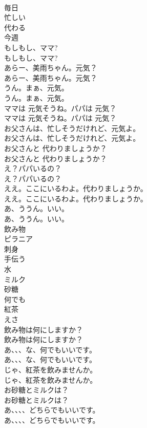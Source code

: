 \documentclass[8pt]{extreport}
\begin{document}
\begin{CJK}{UTF8}{min}
\\	毎日
\\	忙しい
\\	代わる
\\	今週
\\	もしもし、ママ?	
\\	もしもし、ママ? 
\\	あらー、美雨ちゃん。元気？	
\\	あらー、美雨ちゃん。元気？ 
\\	うん。まぁ、元気。	
\\	うん。まぁ、元気。 
\\	ママは 元気そうね。パパは 元気？	
\\	ママは 元気そうね。パパは 元気？ 
\\	お父さんは、忙しそうだけれど、元気よ。	
\\	お父さんは、忙しそうだけれど、元気よ。 
\\	お父さんと 代わりましょうか？	
\\	お父さんと 代わりましょうか？ 
\\	え？パパいるの？	
\\	え？パパいるの？ 
\\	ええ。ここにいるわよ。代わりましょうか。	
\\	ええ。ここにいるわよ。代わりましょうか。 
\\	あ、ううん。いい。	
\\	あ、ううん。いい。 
\\	飲み物
\\	ピラニア
\\	刺身
\\	手伝う
\\	水
\\	ミルク
\\	砂糖
\\	何でも
\\	紅茶
\\	えさ
\\	飲み物は何にしますか？	
\\	飲み物は何にしますか？ 
\\	あ、、、な、何でもいいです。	
\\	あ、、、な、何でもいいです。 
\\	じゃ、紅茶を飲みませんか。	
\\	じゃ、紅茶を飲みませんか。 
\\	お砂糖とミルクは？	
\\	お砂糖とミルクは？ 
\\	あ、、、、どちらでもいいです。	
\\	あ、、、、どちらでもいいです。 

\end{CJK}
\end{document}
